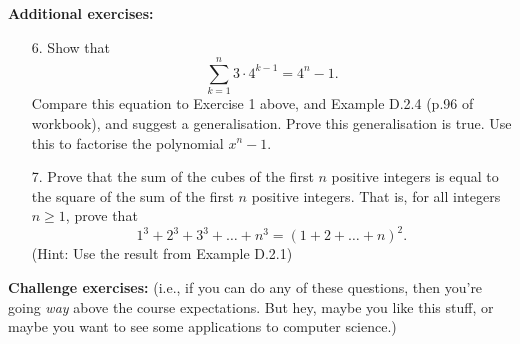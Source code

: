 \documentclass[a4paper,12pt]{article}
\begin{document}
{\bf Additional exercises:}

\begin{enumerate}
\item[6.] Show that
\[
    \sum_{k=1}^n 3 \cdot 4^{k-1} = 4^n - 1.
\]
Compare this equation to Exercise 1 above, and Example D.2.4 (p.96 of
workbook), and suggest a generalisation. Prove this generalisation is true.
Use this to factorise the polynomial $x^n - 1$.
\item[7.] Prove that the sum of the cubes of the first $n$ positive integers is
equal to the square of the sum of the first $n$ positive integers. That is,
for all integers $n \geq 1$, prove that
\[ 1^3 + 2^3 + 3^3 + \dots + n^3 = (1 + 2 + \dots + n)^2. \]
(Hint: Use the result from Example D.2.1)
\end{enumerate}


\newpage

{\bf Challenge exercises:}
(i.e., if you can do any of these questions, then you're going {\em way} above
the course expectations. But hey, maybe you like this stuff, or maybe you want
to see some applications to computer science.)
\end{document}
